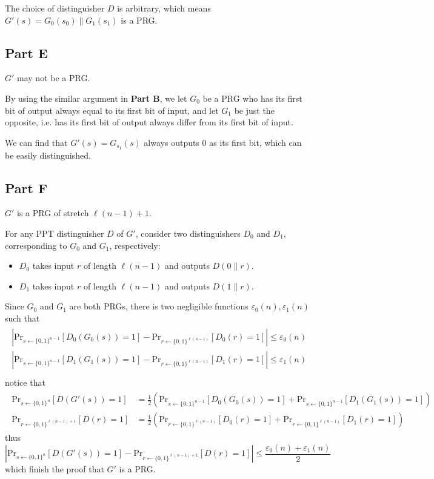 \documentclass[8pt]{article}
\theoremstyle{compact}
\def\le{\leqslant}
\begin{document}
The choice of distinguisher $D$ is arbitrary, which means $G'(s) = G_0(s_0) \| G_1(s_1)$ is a PRG.

\subsection*{Part E}
$G'$ may not be a PRG.

By using the similar argument in \textbf{Part B}, we let $G_0$ be a PRG who has its first bit of output always equal to its first bit of input, and let $G_1$ be just the opposite, i.e. has its first bit of output always differ from its first bit of input.

We can find that $G'(s) = G_{s_1}(s)$ always outputs 0 as its first bit, which can be easily distinguished.

\subsection*{Part F}
$G'$ is a PRG of stretch $\ell(n-1)+1$.

For any PPT distinguisher $D$ of $G'$, consider two distinguishers $D_0$ and $D_1$, corresponding to $G_0$ and $G_1$, respectively:
\begin{itemize}
	\item $D_0$ takes input $r$ of length $\ell(n-1)$ and outputs $D(0 \| r)$.
	\item $D_1$ takes input $r$ of length $\ell(n-1)$ and outputs $D(1 \| r)$.
\end{itemize}

Since $G_0$ and $G_1$ are both PRGs, there is two negligible functions $\varepsilon_0(n), \varepsilon_1(n)$ such that \begin{align*}
	\begin{split}
		\left| \text{Pr}_{s \gets \{0, 1\}^{n-1}}[D_0(G_0(s)) = 1] - \text{Pr}_{r \gets \{0, 1\}^{\ell(n-1)}}[D_0(r) = 1] \right| \le \varepsilon_0(n) \\
		\left| \text{Pr}_{s \gets \{0, 1\}^{n-1}}[D_1(G_1(s)) = 1] - \text{Pr}_{r \gets \{0, 1\}^{\ell(n-1)}}[D_1(r) = 1] \right| \le \varepsilon_1(n) \\
	\end{split}
\end{align*}
notice that \begin{align*}
	\begin{split}
		\text{Pr}_{s \gets \{0, 1\}^n}[D(G'(s)) = 1] &= \frac12 \left(\text{Pr}_{s \gets \{0, 1\}^{n-1}}[D_0(G_0(s)) = 1] + \text{Pr}_{s \gets \{0, 1\}^{n-1}}[D_1(G_1(s)) = 1]\right) \\
		\text{Pr}_{r \gets \{0, 1\}^{\ell(n-1)+1}}[D(r) = 1] &= \frac12 \left(\text{Pr}_{r \gets \{0, 1\}^{\ell(n-1)}}[D_0(r) = 1] + \text{Pr}_{r \gets \{0, 1\}^{\ell(n-1)}}[D_1(r) = 1]\right)
	\end{split}
\end{align*}
thus $$\left| \text{Pr}_{s \gets \{0, 1\}^n}[D(G'(s)) = 1] - \text{Pr}_{r \gets \{0, 1\}^{\ell(n-1)+1}}[D(r) = 1]\right| \le \frac{\varepsilon_0(n) + \varepsilon_1(n)}{2}$$
which finish the proof that $G'$ is a PRG.
\end{document}

